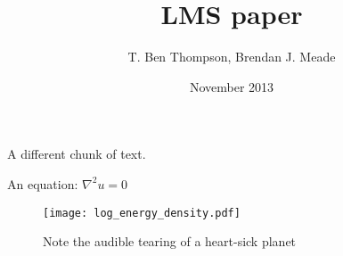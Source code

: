 \documentclass{article}
\title{LMS paper}
\author{T. Ben Thompson, Brendan J. Meade}
\date{November 2013}
\begin{document}
\maketitle

A different chunk of text.

An equation:
$\nabla^2 u = 0$

\begin{figure}[h!]
  \centering
     \texttt{[image: log\_energy\_density.pdf]}
   \caption{Note the audible tearing of a heart-sick planet}
\end{figure}
\end{document}
